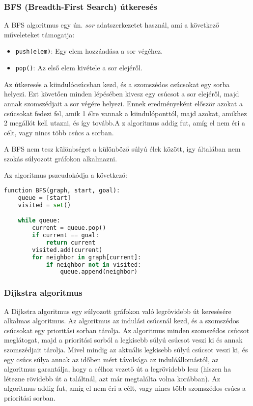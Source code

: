 \subsubsection{BFS (Breadth-First Search) útkeresés}

A BFS algoritmus egy ún. \textit{sor} adatszerkezetet használ\cite{russell2020artificial}, ami a következő műveleteket támogatja:

\begin{itemize}
    \item \texttt{push(elem)}: Egy elem hozzáadása a sor végéhez.
    \item \texttt{pop()}: Az első elem kivétele a sor elejéről.
\end{itemize}

Az útkeresés a kiindulócsúcsban kezd, és a szomszédos csúcsokat egy sorba helyezi. Ezt követően minden lépésében kivesz egy csúcsot a sor elejéről, majd annak szomszédjait a sor végére helyezi. Ennek eredményeként először azokat a csúcsokat fedezi fel, amik 1 élre vannak a kiindulóponttól, majd azokat, amikhez 2 megállót kell utazni, és így tovább\cite{russell2020artificial}.A z algoritmus addig fut, amíg el nem éri a célt, vagy nincs több csúcs a sorban.

A BFS nem tesz különbséget a különböző súlyú élek között, így általában nem szokás súlyozott gráfokon alkalmazni\cite{russell2020artificial}.

Az algoritmus pszeudokódja a következő:

\begin{lstlisting}[language={Python}]
function BFS(graph, start, goal):
    queue = [start]
    visited = set()

    while queue:
        current = queue.pop()
        if current == goal:
            return current
        visited.add(current)
        for neighbor in graph[current]:
            if neighbor not in visited:
                queue.append(neighbor)
\end{lstlisting}

\subsubsection{Dijkstra algoritmus}

A Dijkstra algoritmus egy súlyozott gráfokon való legrövidebb út\cite{russell2020artificial} keresésére alkalmas algoritmus. Az algoritmus az indulási csúcsnál kezd, és a szomszédos csúcsokat egy prioritási sorban tárolja. Az algoritmus minden szomszédos csúcsot meglátogat, majd a prioritási sorból a legkisebb súlyú csúcsot veszi ki és annak szomszédjait tárolja. Mivel mindig az aktuális legkisebb súlyú csúcsot veszi ki, és egy csúcs súlya annak az időben mért távolsága az indulóállomástól, az algoritmus garantálja, hogy a célhoz vezető út a legrövidebb lesz (hiszen ha létezne rövidebb út a találtnál, azt már megtalálta volna korábban). Az algoritmus addig fut, amíg el nem éri a célt, vagy nincs több szomszédos csúcs a prioritási sorban.

